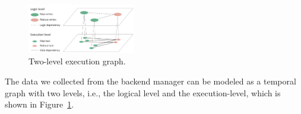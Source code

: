 \begin{figure}[t]
	\centering
	\includegraphics[width=0.42\textwidth]{figures/model/datamodel.pdf}
	\vspace{-3mm}
	\caption{Two-level execution graph.}
	\label{fig:model}
	\vspace{-3mm}
\end{figure}

The data we collected from the backend manager can be modeled as a temporal graph with two levels, i.e., the logical level and the execution-level, which is shown in Figure~\ref{fig:model}. 

%
%

